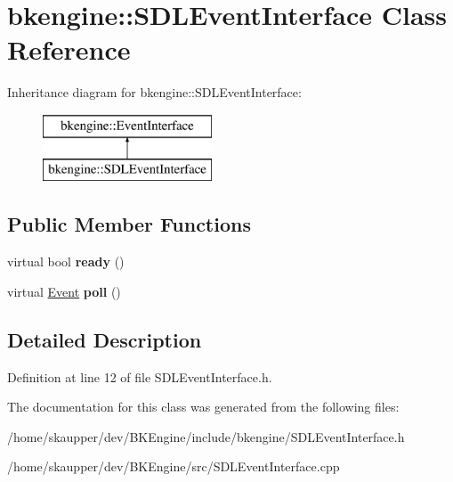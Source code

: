 \hypertarget{classbkengine_1_1SDLEventInterface}{}\section{bkengine\+:\+:S\+D\+L\+Event\+Interface Class Reference}
\label{classbkengine_1_1SDLEventInterface}
Inheritance diagram for bkengine\+:\+:S\+D\+L\+Event\+Interface\+:\begin{figure}[H]
\begin{center}
\leavevmode
\includegraphics[height=2.000000cm]{classbkengine_1_1SDLEventInterface}
\end{center}
\end{figure}
\subsection*{Public Member Functions}
\begin{DoxyCompactItemize}
\item 
\mbox{\label{classbkengine_1_1SDLEventInterface_a3ab921ee8788de5d7f9484d517088b29}} 
virtual bool {\bfseries ready} ()
\item 
\mbox{\label{classbkengine_1_1SDLEventInterface_a86d38142252d30b76aab60007569e7f1}} 
virtual \hyperlink{classbkengine_1_1Event}{Event} {\bfseries poll} ()
\end{DoxyCompactItemize}


\subsection{Detailed Description}


Definition at line 12 of file S\+D\+L\+Event\+Interface.\+h.



The documentation for this class was generated from the following files\+:\begin{DoxyCompactItemize}
\item 
/home/skaupper/dev/\+B\+K\+Engine/include/bkengine/S\+D\+L\+Event\+Interface.\+h\item 
/home/skaupper/dev/\+B\+K\+Engine/src/S\+D\+L\+Event\+Interface.\+cpp\end{DoxyCompactItemize}
